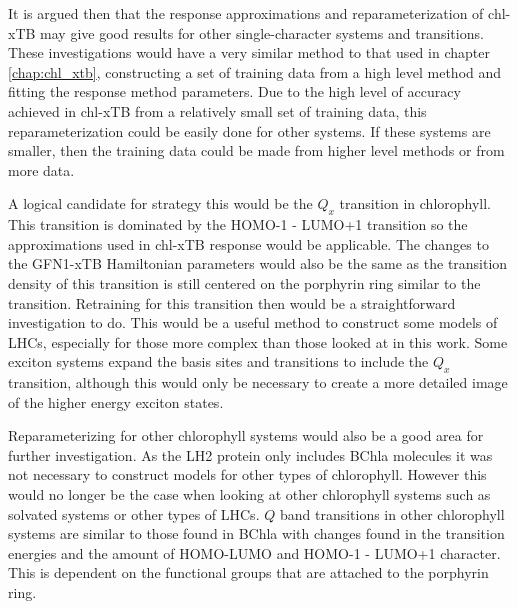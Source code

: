 It is argued then that the response approximations and reparameterization of chl-xTB
may give good results for other single-character systems and transitions. These 
investigations would have a very similar method to that used in chapter \ref{chap:chl_xtb},
constructing a set of training data from a high level method and fitting the response
method parameters. Due to the high level of accuracy achieved in chl-xTB from a
relatively small set of training data, this reparameterization could be easily done
for other systems. If these systems are smaller, then the training data could be
made from higher level methods or from more data. 

A logical candidate for strategy this would be the $Q_x$ transition in chlorophyll.
This transition is dominated by the HOMO-1 - LUMO+1 transition so the approximations
used in chl-xTB response would be applicable. The changes to the GFN1-xTB Hamiltonian
parameters would also be the same as the transition density of this transition is
still centered on the porphyrin ring similar to the \Qy transition. Retraining for
this transition then would be a straightforward investigation to do. This would 
be a useful method to construct some models of LHCs, especially for those more complex
than those looked at in this work. Some exciton systems expand the basis sites and
transitions to include the $Q_x$ transition, although this would only be necessary
to create a more detailed image of the higher energy exciton states.

Reparameterizing for other chlorophyll systems would also be a good area for further
investigation. As the LH2 protein only includes BChla molecules it was not necessary
to construct models for other types of chlorophyll. However this would no longer 
be the case when looking at other chlorophyll systems such as solvated systems or
other types of LHCs. $Q$ band transitions in other chlorophyll systems are similar
to those found in BChla with changes found in the transition energies and the amount
of HOMO-LUMO and HOMO-1 - LUMO+1 character. This is dependent on the functional 
groups that are attached to the porphyrin ring.

